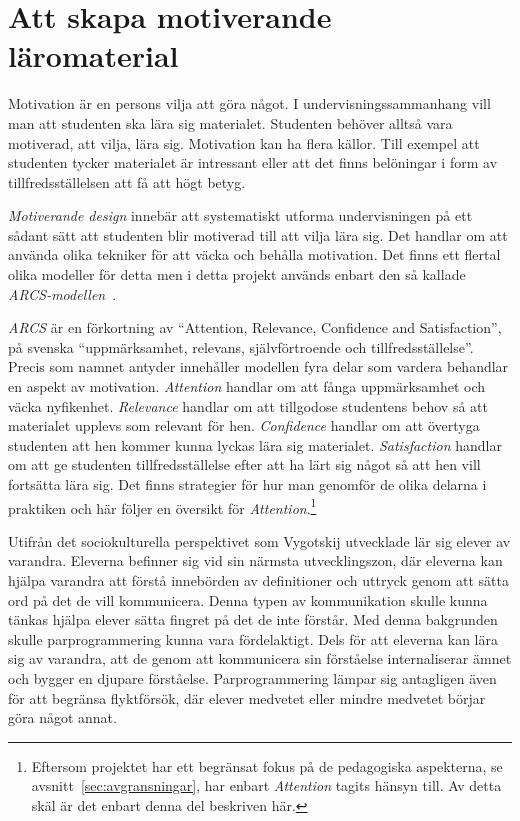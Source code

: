 \section{Att skapa motiverande läromaterial}\label{sec:arcs}
\begin{draft}
Motivation är en persons vilja att göra något. I undervisningssammanhang vill
man att studenten ska lära sig materialet. Studenten behöver alltså vara
motiverad, att vilja, lära sig. Motivation kan ha flera källor. Till exempel att
studenten tycker materialet är intressant eller att det finns belöningar i form
av tillfredsställelsen att få att högt betyg. 

\textit{Motiverande design} innebär att systematiskt utforma undervisningen på
ett sådant sätt att studenten blir motiverad till att vilja lära sig. Det handlar om
att använda olika tekniker för att väcka och behålla motivation. Det finns ett
flertal olika modeller för detta men i detta projekt används enbart den så
kallade \textit{ARCS-modellen}~\cite{arcs_book}.

\textit{ARCS} är en förkortning av ``Attention, Relevance, Confidence and
Satisfaction'', på svenska ``uppmärksamhet, relevans, självförtroende och
tillfredsställelse''. Precis som namnet antyder innehåller modellen fyra delar
som vardera behandlar en aspekt av motivation. \textit{Attention} handlar om att
fånga uppmärksamhet och väcka nyfikenhet. \textit{Relevance} handlar om att
tillgodose studentens behov så att materialet upplevs som relevant för hen.
\textit{Confidence} handlar om att övertyga studenten att hen kommer kunna
lyckas lära sig materialet. \textit{Satisfaction} handlar om att ge studenten
tillfredsställelse efter att ha lärt sig något så att hen vill fortsätta lära
sig. Det finns strategier för hur man genomför de olika delarna i praktiken och
här följer en översikt för \textit{Attention}.\footnote{Eftersom projektet har
ett begränsat fokus på de pedagogiska aspekterna, se
avsnitt~\ref{sec:avgransningar}, har enbart \textit{Attention}  tagits hänsyn till. Av detta skäl är det enbart denna
del beskriven här.}

Utifrån det sociokulturella perspektivet som Vygotskij utvecklade\cite{LSB_kap5}
lär sig elever av varandra. Eleverna befinner sig vid sin närmsta 
utvecklingszon, där eleverna kan hjälpa varandra att förstå innebörden av
definitioner och uttryck genom att sätta ord på det de vill kommunicera. Denna
typen av kommunikation skulle kunna tänkas hjälpa elever sätta fingret på det de
inte förstår. Med denna bakgrunden skulle parprogrammering kunna vara
fördelaktigt. Dels för att eleverna kan lära sig av varandra, att de genom att
kommunicera sin förståelse internaliserar ämnet och bygger en djupare
förståelse. Parprogrammering lämpar sig antagligen även för att begränsa
flyktförsök, där elever medvetet eller mindre medvetet börjar göra något annat.


\end{draft}
